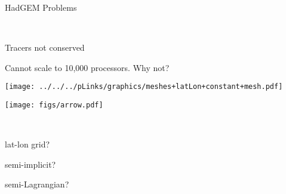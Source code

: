 \begin{slide}{HadGEM Problems}

\ \\
\begin{list0}
\item Tracers not conserved
\item Cannot scale to 10,000 processors. Why not?

\begin{minipage}{0.6\linewidth}
\texttt{[image: ../../../pLinks/graphics/meshes+latLon+constant+mesh.pdf]}

\vspace{-0.55\linewidth} \hspace{2.1in}
\texttt{[image: figs/arrow.pdf]}

\vspace{0.5\linewidth}\ \\
\end{minipage}
\hfill
\begin{minipage}{0.35\linewidth}

\begin{list1}
\item lat-lon grid?
\item semi-implicit?
\item semi-Lagrangian?
\end{list1}

\end{minipage}


\end{list0}
\end{slide}

